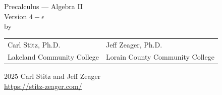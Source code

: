 \makeatletter
{}
\makeatother

\makeindex



\renewcommand{\chaptermark}[1]%
                  {\markboth{#1}{}}
\renewcommand{\sectionmark}[1]%
               {\markright{\thesection\ #1}}
\renewcommand{\headrulewidth}{0pt}
\lhead[\fancyplain{}{\thepage}]%
      {\fancyplain{}{\nouppercase{\rightmark}}}
\rhead[\fancyplain{}{\nouppercase{\leftmark}}]%
      {\fancyplain{}{\thepage}}
\cfoot{}


\frontmatter



\begin{titlepage}
\begin{center}

\vspace*{0.1\paperheight}

\Huge Precalculus --- Algebra II  \\ \vspace{.1in} \large Version $4 - \epsilon$  \\ \vspace{.25in} \large by

\vspace{0.1\paperheight}

\begin{tabularx}{0.953\linewidth}{YY} Carl Stitz, Ph.D. &  Jeff Zeager, Ph.D. \\ Lakeland Community College & Lorain County Community College \\\end{tabularx}

\vfill

\begin{center}
    \sophia
\end{center}

\end{center}
\end{titlepage}

\begingroup
\footnotesize
\setlength{\parindent}{0pt}
\setlength{\parskip}{\baselineskip}

\textcopyright{} 2025 Carl Stitz and Jeff Zeager \\
\url{https://stitz-zeager.com/}


